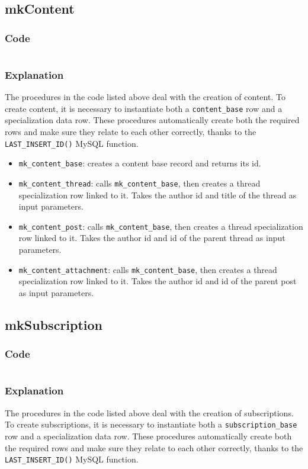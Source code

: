 \documentclass[12pt]{report}
\newcommand{\printSQLtest}[1]
{
    \inputminted[linenos, breaklines, breakbytoken, tabsize=4, fontsize=\footnotesize]{mysql}{#1}
}
\newcommand{\printSQLTablepage}[2]
{
    \newpage
    \subsection{#2}
    \subsubsection{Code}
    \printSQLtest{../sql/parts/#1}
    \subsubsection{Explanation}
}
\begin{document}
                \printSQLTablepage{21_procsMkContent.sql}{mkContent}
                    The procedures in the code listed above deal with the creation of content. To create content, it is necessary to instantiate both a \texttt{content_base} row and a specialization data row.
                    These procedures automatically create both the required rows and make sure they relate to each other correctly, thanks to the \texttt{LAST_INSERT_ID()} MySQL function.

                    \begin{itemize}
                        \item \texttt{mk_content_base}: creates a content base record and returns its id.
                        \item \texttt{mk_content_thread}: calls \texttt{mk_content_base}, then creates a thread specialization row linked to it.
                        Takes the author id and title of the thread as input parameters.
                        \item \texttt{mk_content_post}: calls \texttt{mk_content_base}, then creates a thread specialization row linked to it.
                        Takes the author id and id of the parent thread as input parameters.
                        \item \texttt{mk_content_attachment}: calls \texttt{mk_content_base}, then creates a thread specialization row linked to it.
                        Takes the author id and id of the parent post as input parameters.
                    \end{itemize}


                \printSQLTablepage{22_procsMkSubscription.sql}{mkSubscription}
                    The procedures in the code listed above deal with the creation of subscriptions. To create subscriptions, it is necessary to instantiate both a \texttt{subscription_base} row and a specialization data row.
                    These procedures automatically create both the required rows and make sure they relate to each other correctly, thanks to the \texttt{LAST_INSERT_ID()} MySQL function.
\end{document}
